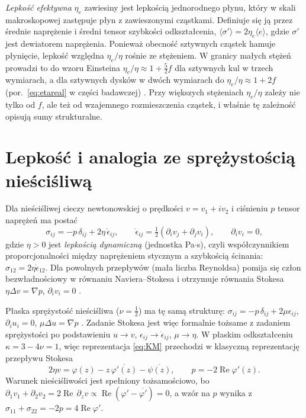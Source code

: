 \documentclass[12pt,a4paper,twoside,openright]{report}
\theoremstyle{definition}
\theoremstyle{remark}
\newcommand{\cc}[1]{\overline{#1}}
\renewcommand{\Re}{\operatorname{Re}}
\begin{document}
\emph{Lepkość efektywna} $\eta_e$ zawiesiny jest lepkością jednorodnego płynu, który w skali makroskopowej zastępuje płyn z zawieszonymi cząstkami. Definiuje się ją przez średnie naprężenie i średni tensor szybkości odkształcenia, $\langle\sigma'\rangle=2\eta_e\langle e\rangle$, gdzie $\sigma'$ jest dewiatorem naprężenia. Ponieważ obecność sztywnych cząstek hamuje płynięcie, lepkość względna $\eta_e/\eta$ rośnie ze stężeniem. W granicy małych stężeń prowadzi to do wzoru Einsteina $\eta_e/\eta\approx1+\tfrac52 f$ dla sztywnych kul w trzech wymiarach, a dla sztywnych dysków w dwóch wymiarach do $\eta_e/\eta\approx1+2f$ (por.\ \eqref{eq:etareal} w części badawczej) \cite{batchelor1972determination,mewis2012colloidal}. Przy większych stężeniach $\eta_e/\eta$ zależy nie tylko od $f$, ale też od wzajemnego rozmieszczenia cząstek, i właśnie tę zależność opisują sumy strukturalne.

\section{\texorpdfstring{Lepkość i analogia ze sprężystością nieściśliwą}{Lepkość i analogia ze sprężystością nieściśliwą}}\label{ssec:visc}

Dla nieściśliwej cieczy newtonowskiej o prędkości $v=v_1+iv_2$ i ciśnieniu $p$ tensor naprężeń ma postać \cite{landau1987fluid}
\begin{equation*}
{\sigma_{ij}=-p\,\delta_{ij}+2\eta\,\dot\epsilon_{ij},\qquad \dot\epsilon_{ij}=\tfrac12(\partial_iv_j+\partial_jv_i),\qquad \partial_iv_i=0,}
\end{equation*}
gdzie $\eta>0$ jest \emph{lepkością dynamiczną} (jednostka Pa$\cdot$s), czyli współczynnikiem proporcjonalności między naprężeniem stycznym a szybkością ścinania: $\sigma_{12}=2\eta\dot\epsilon_{12}$. Dla powolnych przepływów (mała liczba Reynoldsa) pomija się człon bezwładnościowy w równaniu Naviera--Stokesa i otrzymuje równania Stokesa $\eta\Delta v=\nabla p$, $\partial_iv_i=0$ \cite{landau1987fluid}.

Płaska sprężystość nieściśliwa ($\nu=\tfrac12$) ma tę samą strukturę: $\sigma_{ij}=-p\,\delta_{ij}+2\mu\epsilon_{ij}$, $\partial_iu_i=0$, $\mu\Delta u=\nabla p$ \cite{landau1986theory}. Zadanie Stokesa jest więc formalnie tożsame z zadaniem sprężystości po podstawieniu $u\to v$, $\epsilon_{ij}\to\dot\epsilon_{ij}$, $\mu\to\eta$. W płaskim odkształceniu $\kappa=3-4\nu=1$, więc reprezentacja \eqref{eq:KM} przechodzi w klasyczną reprezentację przepływu Stokesa
\begin{equation*}
{2\eta v=\varphi(z)-z\,\cc{\varphi'(z)}-\cc{\psi(z)},\qquad p=-2\Re\varphi'(z).}
\end{equation*}
Warunek nieściśliwości jest spełniony tożsamościowo, bo $\partial_1v_1+\partial_2v_2=2\Re\,\partial_zv\propto\Re(\varphi'-\cc{\varphi'})=0$, a wzór na $p$ wynika z $\sigma_{11}+\sigma_{22}=-2p=4\Re\varphi'$.
\end{document}

